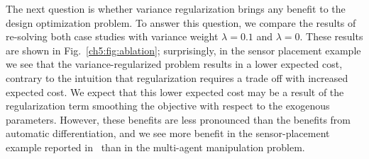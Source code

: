 The next question is whether variance regularization brings any benefit to the design optimization problem. To answer this question, we compare the results of re-solving both case studies with variance weight $\lambda = 0.1$ and $\lambda = 0$. These results are shown in Fig.~\ref{ch5:fig:ablation}; surprisingly, in the sensor placement example we see that the variance-regularized problem results in a lower expected cost, contrary to the intuition that regularization requires a trade off with increased expected cost. We expect that this lower expected cost may be a result of the regularization term smoothing the objective with respect to the exogenous parameters. However, these benefits are less pronounced than the benefits from automatic differentiation, and we see more benefit in the sensor-placement example reported in~\cite{dawsonCertifiableRobotDesign2022a} than in the multi-agent manipulation problem.

